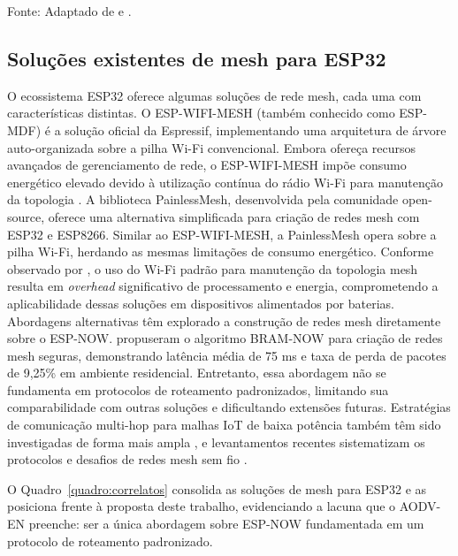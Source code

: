 Fonte: Adaptado de  e .

\subsection{Soluções existentes de mesh para
ESP32}\label{soluuxe7uxf5es-existentes-de-mesh-para-esp32}

O ecossistema ESP32 oferece algumas soluções de rede mesh, cada uma com
características distintas. O ESP-WIFI-MESH (também conhecido como
ESP-MDF) é a solução oficial da Espressif, implementando uma arquitetura
de árvore auto-organizada sobre a pilha Wi-Fi convencional. Embora
ofereça recursos avançados de gerenciamento de rede, o ESP-WIFI-MESH
impõe consumo energético elevado devido à utilização contínua do rádio
Wi-Fi para manutenção da topologia \cite{sestak2022}. A biblioteca
PainlessMesh, desenvolvida pela comunidade open-source, oferece uma
alternativa simplificada para criação de redes mesh com ESP32 e ESP8266.
Similar ao ESP-WIFI-MESH, a PainlessMesh opera sobre a pilha Wi-Fi,
herdando as mesmas limitações de consumo energético. Conforme observado
por , o uso do Wi-Fi padrão para manutenção da
topologia mesh resulta em \emph{overhead} significativo de processamento
e energia, comprometendo a aplicabilidade dessas soluções em
dispositivos alimentados por baterias. Abordagens alternativas têm
explorado a construção de redes mesh diretamente sobre o ESP-NOW.
 propuseram o algoritmo BRAM-NOW para criação
de redes mesh seguras, demonstrando latência média de 75 ms e taxa de
perda de pacotes de 9,25\% em ambiente residencial. Entretanto, essa
abordagem não se fundamenta em protocolos de roteamento padronizados,
limitando sua comparabilidade com outras soluções e dificultando
extensões futuras. Estratégias de comunicação multi-hop para malhas IoT
de baixa potência também têm sido investigadas de forma mais ampla
\cite{arregui2025}, e levantamentos recentes sistematizam os protocolos e
desafios de redes mesh sem fio \cite{chaizeng2021}.

O Quadro~\ref{quadro:correlatos} consolida as soluções de mesh para ESP32
e as posiciona frente à proposta deste trabalho, evidenciando a lacuna que
o AODV-EN preenche: ser a única abordagem sobre ESP-NOW fundamentada em um
protocolo de roteamento padronizado.

